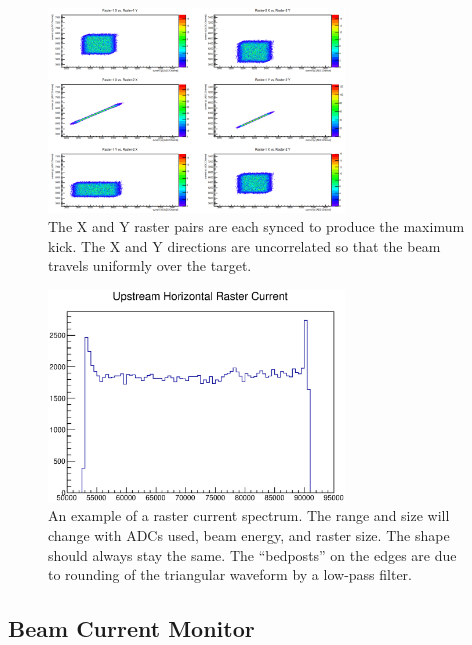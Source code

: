 \begin{figure}
\begin{center}
	\includegraphics[width=0.7\textwidth]{./setup/fig/raster_sync.png}
	\caption{The X and Y raster pairs are each synced to produce the maximum kick. The X and Y directions are uncorrelated so that the beam travels uniformly over the target.}
	\label{fig:raster}
\end{center}
\end{figure}

\begin{figure}
\begin{center}
	\includegraphics[width=0.7\textwidth]{./setup/fig/ex_rast.eps}
	\caption{An example of a raster current spectrum. The range and size will change with ADCs used, beam energy, and raster size. The shape should always stay the same. The ``bedposts'' on the edges are due to rounding of the triangular waveform by a low-pass filter.}
	\label{fig:exrast}
\end{center}
\end{figure}


\subsection{Beam Current Monitor}

